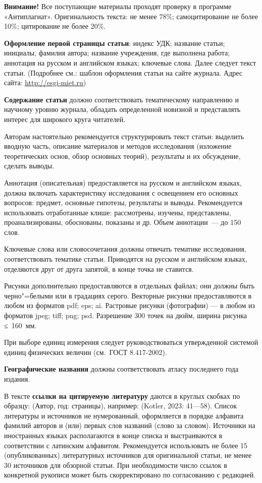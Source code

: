 \begin{multicols}{2}
    \textbf{Внимание!} Все поступающие материалы
    проходят проверку в программе «Антиплагиат». Оригинальность текста: не менее 78\%;
    самоцитирование не более 10\%; цитирование не более 20\%.

    \textbf{Оформление первой страницы статьи}:
    индекс УДК; название статьи; инициалы,
    фамилия автора; название учреждения, где
    выполнена работа; аннотация на русском
    и английском языках; ключевые слова. Далее
    следует текст статьи. (Подробнее см.: шаблон
    оформления статьи на сайте журнала. Адрес
    сайта: \url{http://esgi-miet.ru})
    
    \textbf{Содержание статьи} должно соответствовать тематическому направлению и научному уровню журнала, обладать определенной новизной и представлять интерес для
    широкого круга читателей.

    Авторам настоятельно рекомендуется
    структурировать текст статьи: выделить
    вводную часть, описание материалов и методов исследования (изложение теоретических основ, обзор основных теорий), результаты и их обсуждение, сделать выводы.
    
    {Аннотация} (описательная) предоставляется на русском и английском языках,
    должна включать характеристику исследования с освещением его основных вопросов:
    предмет, основные гипотезы, результаты
    и выводы. Рекомендуется использовать отработанные клише: рассмотрены, изучены,
    представлены, проанализированы, обоснованы, показаны и др. Объем аннотации — 
    до 150 слов.
    
    {Ключевые слова} или словосочетания
    должны отвечать тематике исследования, соответствовать тематике статьи. Приводятся
    на русском и английском языках, отделяются
    друг от друга запятой, в конце точка не ставится.
    
    {Рисунки} дополнительно предоставляются в отдельных файлах; они должны
    быть черно"=белыми или в градациях серого.
    Векторные рисунки предоставляются в любом
    из форматов pdf; eps; ai. Растровые рисунки
    (фотографии) — в любом из форматов jpeg;
tiff; png; psd. Разрешение 300 точек на дюйм,
ширина рисунка ≤ 160 мм.

При выборе единиц измерения следует
руководствоваться утвержденной системой
единиц физических величин (см. ГОСТ
\mbox{8.417-2002}).

\textbf{Географические названия} должны соответствовать атласу последнего года издания.

В тексте \textbf{ссылки на цитируемую литературу} даются в круглых скобках по образцу:
(Автор, год: страницы), например: (Kotler,
2023: 41—58). Список литературы и источников не нумерованный, оформляется в порядке алфавита фамилий авторов и (или) первых слов названий (слово за словом). Источники на иностранных языках располагаются
в конце списка и выстраиваются в соответствии с латинским алфавитом. Рекомендуется
использовать не более 15 (опубликованных)
литературных источников для оригинальной
статьи, не менее 30 источников для обзорной
статьи. При необходимости число ссылок
в конкретной рукописи может быть скорректировано по согласованию с редакцией.


\end{multicols}
